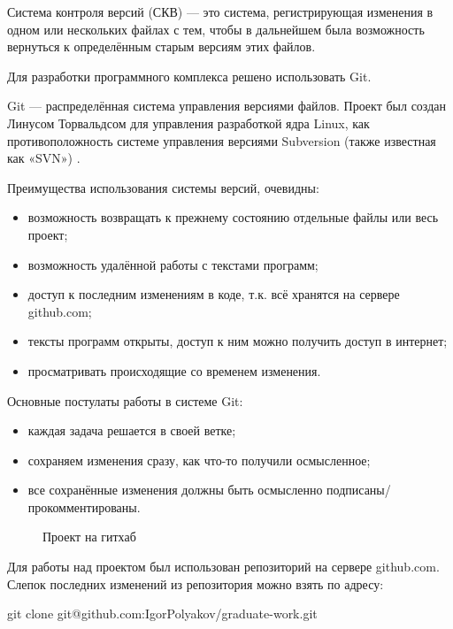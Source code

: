 Система контроля версий (СКВ) — это система, регистрирующая изменения в одном или нескольких файлах с тем, чтобы в дальнейшем была возможность вернуться к определённым старым версиям этих файлов.

Для разработки программного комплекса решено использовать Git.

Git  — распределённая система управления версиями файлов. Проект был создан Линусом Торвальдсом для управления разработкой ядра Linux, как противоположность системе управления версиями Subversion (также известная как «SVN») \cite{progit}.

Преимущества использования системы версий, очевидны:
\begin{itemize}
\item возможность возвращать к прежнему состоянию отдельные файлы или весь проект;
\item возможность удалённой работы с текстами программ;
\item доступ к последним изменениям в коде, т.к. всё хранятся на сервере github.com;
\item тексты программ открыты, доступ к ним можно получить доступ в интернет;
\item просматривать происходящие со временем изменения.
\end{itemize}
Основные постулаты работы в системе Git:

\begin{itemize}
\item каждая задача решается в своей ветке;
\item сохраняем изменения сразу, как что-то получили осмысленное;
\item все сохранённые изменения должны быть осмысленно подписаны/прокомментированы.
\end{itemize}
\begin{figure}[ht]
\caption{Проект на гитхаб}
\label{pic:github}
\end{figure}

Для работы над проектом был использован репозиторий на сервере github.com. Слепок последних изменений из репозитория можно взять по адресу:

git clone git@github.com:IgorPolyakov/graduate-work.git

